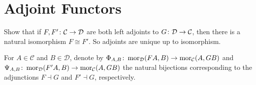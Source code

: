 \bs

\es



\section{Adjoint Functors}

\begin{extra}
Show that if $F, F' \colon \mathcal{C} \to \mathcal{D}$ are both left adjoints to $G \colon \mathcal{D}\to\mathcal{C}$, then there is a natural isomorphism $F \cong F'$. So adjoints are unique up to isomorphism.
\end{extra}

\bs
For $A\in \mathcal{C}$ and $B\in\mathcal{D}$, denote by $\Phi_{A,B}\colon\operatorname{mor}_{\mathcal{D}}(FA,B)\to\operatorname{mor}_{\mathcal{C}}(A,GB)$ and $\Psi_{A,B}\colon\operatorname{mor}_{\mathcal{D}}(F'A,B)\to\operatorname{mor}_{\mathcal{C}}(A,GB)$ the natural bijections corresponding to the adjunctions $F\dashv G$ and $F'\dashv G$, respectively.

